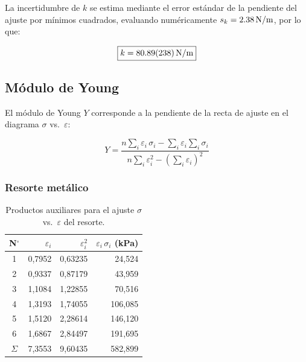 La incertidumbre de $k$ se estima mediante el error estándar de la
pendiente del ajuste por mínimos cuadrados, evaluando numéricamente
$s_k = \qty{2{,}38}{N/m}$, por lo que:

\begin{equation}
    \boxed{k = \qty{80{,}89 \pm 2{,}38}{N/m}}
    \label{eq:resultado_k}
\end{equation}

\subsection{Módulo de Young}

El módulo de Young $Y$ corresponde a la pendiente de la recta de ajuste
en el diagrama $\sigma$ vs.\ $\varepsilon$:

\begin{equation}
    Y = \frac{n\displaystyle\sum_{i}\varepsilon_i\,\sigma_{i}
              - \displaystyle\sum_{i}\varepsilon_i\displaystyle\sum_{i}\sigma_{i}}
             {n\displaystyle\sum_{i}\varepsilon_i^2
              - \!\left(\displaystyle\sum_{i}\varepsilon_i\right)^{\!2}}
    \label{eq:Young_lsq}
\end{equation}

\subsubsection{Resorte metálico}

\begin{table}[H]
    \centering
    \caption{Productos auxiliares para el ajuste $\sigma$ vs.\ $\varepsilon$
             del resorte.}
    \label{tab:sumas_young_resorte}
    \begin{tabular}{crrr}
        \toprule
        \textbf{N$^{\circ}$}
            & \textbf{$\varepsilon_i$}
            & \textbf{$\varepsilon_i^2$}
            & \textbf{$\varepsilon_i\,\sigma_i$ (kPa)} \\
        \midrule
        1 & 0{,}7952 & 0{,}63235 &  24{,}524 \\
        2 & 0{,}9337 & 0{,}87179 &  43{,}959 \\
        3 & 1{,}1084 & 1{,}22855 &  70{,}516 \\
        4 & 1{,}3193 & 1{,}74055 & 106{,}085 \\
        5 & 1{,}5120 & 2{,}28614 & 146{,}120 \\
        6 & 1{,}6867 & 2{,}84497 & 191{,}695 \\
        \midrule
        $\Sigma$ & 7{,}3553 & 9{,}60435 & 582{,}899 \\
        \bottomrule
    \end{tabular}
\end{table}

